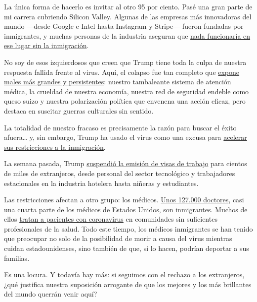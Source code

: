 La única forma de hacerlo es invitar al otro 95 por ciento. Pasé una
gran parte de mi carrera cubriendo Silicon Valley. Algunas de las
empresas más innovadoras del mundo ---desde Google e Intel hasta
Instagram y Stripe--- fueron fundadas por inmigrantes, y muchas personas
de la industria aseguran que
\href{https://www.nytimes3xbfgragh.onion/es/2017/02/23/espanol/por-que-silicon-valley-no-funcionaria-sin-inmigrantes.html}{nada
funcionaría en ese lugar sin la inmigración}.

No soy de esos izquierdosos que creen que Trump tiene toda la culpa de
nuestra respuesta fallida frente al virus. Aquí, el colapso fue tan
completo que
\href{https://www.theatlantic.com/magazine/archive/2020/06/underlying-conditions/610261/}{expone
males más grandes y persistentes}: nuestro tambaleante sistema de
atención médica, la crueldad de nuestra economía, nuestra red de
seguridad endeble como queso suizo y nuestra polarización política que
envenena una acción eficaz, pero destaca en suscitar guerras culturales
sin sentido.

La totalidad de nuestro fracaso es precisamente la razón para buscar el
éxito afuera\ldots{} y, sin embargo, Trump ha usado el virus como una
excusa para
\href{https://www.nytimes3xbfgragh.onion/2020/06/12/us/politics/coronavirus-trump-immigration-policies.html}{acelerar
sus restricciones a la inmigración}.

La semana pasada, Trump
\href{https://www.nytimes3xbfgragh.onion/2020/06/22/us/politics/trump-h1b-work-visas.html}{suspendió
la emisión de visas de trabajo} para cientos de miles de extranjeros,
desde personal del sector tecnológico y trabajadores estacionales en la
industria hotelera hasta niñeras y estudiantes.

Las restricciones afectan a otro grupo: los médicos.
\href{https://www.nbcnews.com/news/asian-america/fear-deportation-heightened-immigrant-doctors-h-1b-visas-amid-pandemic-n1204791}{Unos
127.000 doctores}, casi una cuarta parte de los médicos de Estados
Unidos, son inmigrantes. Muchos de ellos
\href{https://www.motherjones.com/coronavirus-updates/2020/06/immigrant-h1b-doctors-coronavirus-green-card/}{tratan
a pacientes con coronavirus} en comunidades sin suficientes
profesionales de la salud. Todo este tiempo, los médicos inmigrantes se
han tenido que preocupar no solo de la posibilidad de morir a causa del
virus mientras cuidan estadounidenses, sino también de que, si lo hacen,
podrían deportar a sus familias.

Es una locura. Y todavía hay más: si seguimos con el rechazo a los
extranjeros, ¿qué justifica nuestra suposición arrogante de que los
mejores y los más brillantes del mundo querrán venir aquí?

